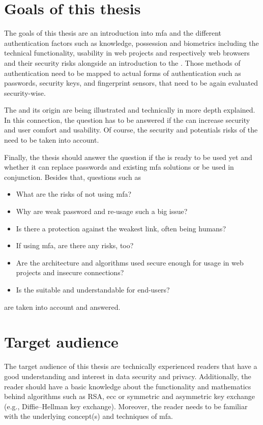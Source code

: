 \section{Goals of this thesis}

The goals of this thesis are an introduction into \gls{mfa} and the different authentication factors such as \frqq knowledge, possession and biometrics\flqq{} including the technical functionality, usability in web projects and respectively web browsers and their security risks alongside an introduction to the \wa. Those methods of authentication need to be mapped to actual forms of authentication such as passwords, security keys, and fingerprint sensors, that need to be again evaluated security-wise.

The \wa{} and its origin are being illustrated and technically in more depth explained. In this connection, the question has to be answered if the \wa{} can increase security and user comfort and usability. Of course, the security and potentials risks of the \wa{} need to be taken into account.

Finally, the thesis should answer the question if the \wa{} is ready to be used yet and whether it can replace passwords and existing \gls{mfa} solutions or be used in conjunction.
Besides that, questions such as

\begin{itemize}
	\item What are the risks of not using \gls{mfa}?
	\item Why are weak password and re-usage such a big issue?
	\item Is there a protection against the weakest link, often being humans?
	\item If using \gls{mfa}, are there any risks, too?
	\item Are the architecture and algorithms used secure enough for usage in web projects and insecure connections?
	\item Is the \wa{} suitable and understandable for end-users?
\end{itemize}

are taken into account and answered.

\section{Target audience}

The target audience of this thesis are technically experienced readers that have a good understanding and interest in data security and privacy. Additionally, the reader should have a basic knowledge about the functionality and mathematics behind algorithms such as RSA, \gls{ecc} or symmetric and asymmetric key exchange (e.g., Diffie–Hellman key exchange). Moreover, the reader needs to be familiar with the underlying concept(s) and techniques of \gls{mfa}.

